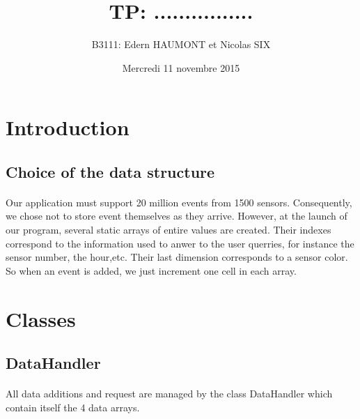 \documentclass[a4paper, 12pts]{article}
\title{TP: ................}
\author{B3111: Edern HAUMONT et Nicolas SIX}
\date{Mercredi 11 novembre 2015}
\begin{document}
\begin{titlepage}

\maketitle

\end{titlepage}


\tableofcontents

\pagebreak


\section{Introduction}
\paragraph{}

\subsection{Choice of the data structure}
\paragraph{}
Our application must support 20 million events from 1500 sensors. Consequently, we chose not to store event themselves as they arrive. However, at the launch of our program, several static arrays of entire values are created. Their indexes correspond to the information used to anwer to the user querries, for instance the sensor number, the hour,etc. Their last dimension corresponds to a sensor color. So when an event is added, we just increment one cell in each array.

\section{Classes}

\subsection{DataHandler}
\paragraph{}
All data additions and request are managed by the class DataHandler which contain itself the 4 data arrays.
\end{document}
